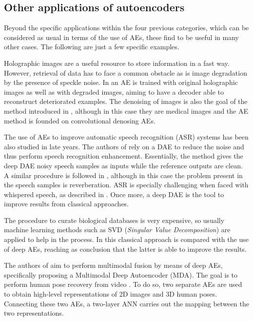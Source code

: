 \subsection{Other applications of autoencoders}
Beyond the specific applications within the four previous categories, which can be considered as usual in terms of the use of AEs, these find to be useful in many other cases. The following are just a few specific examples.

Holographic images \cite{DigitalHolography} are a useful resource to store information in a fast way. However, retrieval of data has to face a common obstacle as is image degradation by the presence of speckle noise. In \cite{Shimobaba2017} an AE is trained with original holographic images as well as with degraded images, aiming to have a decoder able to reconstruct deteriorated examples. The denoising of images is also the goal of the method introduced in \cite{DenoisingMedicalImages}, although in this case they are medical images and the AE method is founded on convolutional denosing AEs.

The use of AEs to improve automatic speech recognition (ASR) systems has been also studied in late years. The authors of \cite{SpeechDAE} rely on a DAE to reduce the noise and thus perform speech recognition enhancement. Essentially, the method gives the deep DAE noisy speech samples as inputs while the reference outputs are clean. A similar procedure is followed in \cite{ReverberantSpeechDAE}, although in this case the problem present in the speech samples is reverberation. ASR is specially challenging when faced with whispered speech, as described in \cite{WhisperedSppechDAE}. Once more, a deep DAE is the tool to improve results from classical approaches.

The procedure to curate biological databases is very expensive, so usually machine learning methods such as SVD (\textit{Singular Value Decomposition}) \cite{SVD} are applied to help in the process. In \cite{ANNsPCA2} this classical approach is compared with the use of deep AEs, reaching as conclusion that the latter is able to improve the results.

The authors of  \cite{Hong2015} aim to perform multimodal fusion by means of deep AEs, specifically proposing a Multimodal Deep Autoencoder (MDA). The goal is to perform human pose recovery from video \cite{HumanPoseRecovery}. To do so, two separate AEs are used to obtain high-level representations of 2D images and 3D human poses. Connecting these two AEs, a two-layer ANN carries out the mapping between the two representations.

